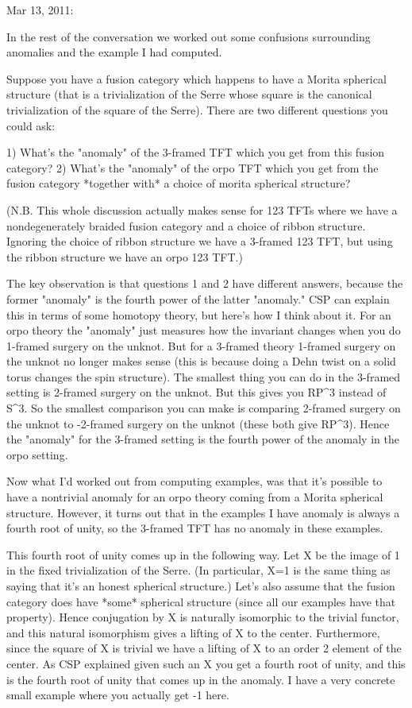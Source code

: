 Mar 13, 2011:

In the rest of the conversation we worked out some confusions surrounding anomalies and the example I had computed.

Suppose you have a fusion category which happens to have a Morita spherical structure (that is a trivialization of the Serre whose square is the canonical trivialization of the square of the Serre).  There are two different questions you could ask:

1) What's the "anomaly" of the 3-framed TFT which you get from this fusion category?
2) What's the "anomaly" of the orpo TFT which you get from the fusion category *together with* a choice of morita spherical structure?

(N.B. This whole discussion actually makes sense for 123 TFTs where we have a nondegenerately braided fusion category and a choice of ribbon structure.  Ignoring the choice of ribbon structure we have a 3-framed 123 TFT, but using the ribbon structure we have an orpo 123 TFT.)

The key observation is that questions 1 and 2 have different answers, because the former "anomaly" is the fourth power of the latter "anomaly."  CSP can explain this in terms of some homotopy theory, but here's how I think about it.  For an orpo theory the "anomaly" just measures how the invariant changes when you do 1-framed surgery on the unknot.  But for a 3-framed theory 1-framed surgery on the unknot no longer makes sense (this is because doing a Dehn twist on a solid torus changes the spin structure).  The smallest thing you can do in the 3-framed setting is 2-framed surgery on the unknot.  But this gives you RP^3 instead of S^3.  So the smallest comparison you can make is comparing 2-framed surgery on the unknot to -2-framed surgery on the unknot (these both give RP^3).  Hence the "anomaly" for the 3-framed setting is the fourth power of the anomaly in the orpo setting.

Now what I'd worked out from computing examples, was that it's possible to have a nontrivial anomaly for an orpo theory coming from a Morita spherical structure.  However, it turns out that in the examples I have anomaly is always a fourth root of unity, so the 3-framed TFT has no anomaly in these examples.

This fourth root of unity comes up in the following way.  Let X be the image of 1 in the fixed trivialization of the Serre.  (In particular, X=1 is the same thing as saying that it's an honest spherical structure.)  Let's also assume that the fusion category does have *some* spherical structure (since all our examples have that property).  Hence conjugation by X is naturally isomorphic to the trivial functor, and this natural isomorphism gives a lifting of X to the center.  Furthermore, since the square of X is trivial we have a lifting of X to an order 2 element of the center.  As CSP explained given such an X you get a fourth root of unity, and this is the fourth root of unity that comes up in the anomaly.  I have a very concrete small example where you actually get -1 here.

